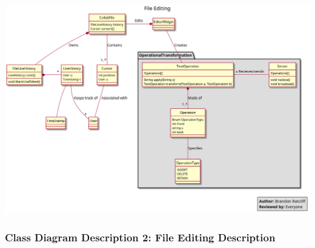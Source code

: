 \documentclass[twoside,letterpaper]{article}
\begin{document}
	\includegraphics[width=6.0in]{images/ClassDiagrams/EditFile}
	
	\newpage
	
	\subsubsection[Class Diagram Description 2: File Editing Description]{\rmfamily\bfseries\color{black}
		Class Diagram Description 2: File Editing Description}
	\hypertarget{RefHeading22059017292}{}
	
\end{document}

